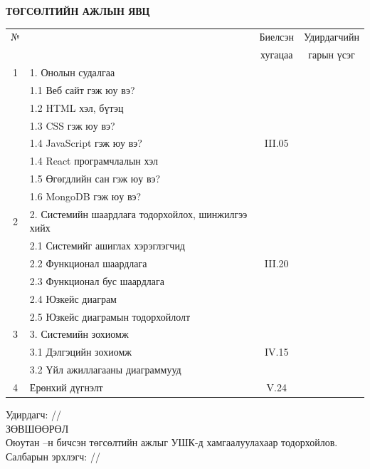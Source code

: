 \begin{titlepage}

\begin{center}

\vspace*{2cm}
\textbf{{\large ТӨГСӨЛТИЙН АЖЛЫН ЯВЦ}}\\[0.5cm]

\begin{tabular}{|c|p{7cm}|c|c|}
	\hline
	№ & \makebox[7cm][c]{Төслийн бүлэг хэсгүүдийн нэр} & Биелсэн     & Удирдагчийн \\
	  &                    & хугацаа    & гарын үсэг \\ \hline
	1 & {1. Онолын судалгаа} & & \\
	& 1.1 Веб сайт гэж юу вэ? & & \\
	& 1.2 HTML хэл, бүтэц & & \\ 
	& 1.3 CSS гэж юу вэ? &  & \\ 
	& 1.4 JavaScript гэж юу вэ? & III.05 & \\
	& 1.4 React програмчлалын хэл & & \\
    & 1.5 Өгөгдлийн сан гэж юу вэ? & & \\
    & 1.6 MongoDB гэж юу вэ? & & \\ \hline
    
	2 & {2. Системийн шаардлага тодорхойлох, шинжилгээ хийх} & & \\
	& 2.1 Системийг ашиглах хэрэглэгчид & & \\
    & 2.2 Функционал шаардлага & III.20 & \\
    & 2.3 Функционал бус шаардлага& & \\
    & 2.4 Юзкейс диаграм& & \\
    & 2.5 Юзкейс диаграмын тодорхойлолт& &  \\ \hline
    
	3 & {3. Системийн зохиомж}     &  & \\
    & 3.1 Дэлгэцийн зохиомж &IV.15  & \\
    & 3.2 Үйл ажиллагааны диаграммууд & &\\ \hline

    4 & {Ерөнхий дүгнэлт} & V.24 & \\ \hline
\end{tabular}


\end{center}

\begin{center}
Удирдагч: \makebox[3cm]{\dotfill} /\supname/ \\

\vspace{5cm}
ЗӨВШӨӨРӨЛ \\[0.5cm]
Оюутан \shortname --н бичсэн төгсөлтийн ажлыг УШК-д хамгаалуулахаар тодорхойлов.\\[0.5cm]
Салбарын эрхлэгч: \makebox[3cm]{\dotfill} /\chairname/
\end{center}

\end{titlepage}
